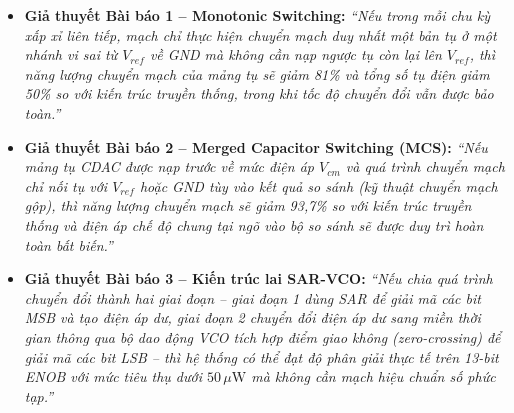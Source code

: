 \documentclass[12pt,a4paper]{article}
\begin{document}
\begin{itemize}
    \item \textbf{Giả thuyết Bài báo 1 -- Monotonic Switching:}
    \textit{``Nếu trong mỗi chu kỳ xấp xỉ liên tiếp, mạch chỉ thực hiện chuyển mạch duy nhất một bản tụ ở một nhánh vi sai từ $V_{ref}$ về GND mà không cần nạp ngược tụ còn lại lên $V_{ref}$, thì năng lượng chuyển mạch của mảng tụ sẽ giảm 81\% và tổng số tụ điện giảm 50\% so với kiến trúc truyền thống, trong khi tốc độ chuyển đổi vẫn được bảo toàn.''}
    \item \textbf{Giả thuyết Bài báo 2 -- Merged Capacitor Switching (MCS):}
    \textit{``Nếu mảng tụ CDAC được nạp trước về mức điện áp $V_{cm}$ và quá trình chuyển mạch chỉ nối tụ với $V_{ref}$ hoặc GND tùy vào kết quả so sánh (kỹ thuật chuyển mạch gộp), thì năng lượng chuyển mạch sẽ giảm 93,7\% so với kiến trúc truyền thống và điện áp chế độ chung tại ngõ vào bộ so sánh sẽ được duy trì hoàn toàn bất biến.''}
    \item \textbf{Giả thuyết Bài báo 3 -- Kiến trúc lai SAR-VCO:}
    \textit{``Nếu chia quá trình chuyển đổi thành hai giai đoạn -- giai đoạn 1 dùng SAR để giải mã các bit MSB và tạo điện áp dư, giai đoạn 2 chuyển đổi điện áp dư sang miền thời gian thông qua bộ dao động VCO tích hợp điểm giao không (zero-crossing) để giải mã các bit LSB -- thì hệ thống có thể đạt độ phân giải thực tế trên 13-bit ENOB với mức tiêu thụ dưới $50\,\mu\text{W}$ mà không cần mạch hiệu chuẩn số phức tạp.''}
\end{itemize}
\end{document}

